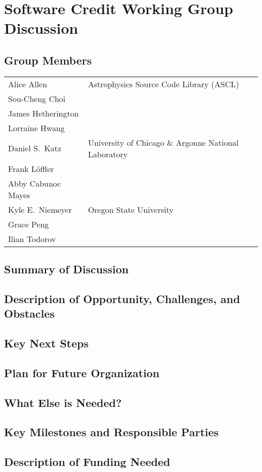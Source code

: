 \section{Software Credit Working Group Discussion}
\label{sec:appendix_SW_credit}

\subsection{Group Members}
{\small
\begin{longtable}{ll}
   Alice Allen            &  Astrophysics Source Code Library (ASCL)
\\ Sou-Cheng Choi         &  
\\ James Hetherington     &  
\\ Lorraine Hwang         &  
\\ Daniel S.\ Katz        &  University of Chicago \& Argonne National Laboratory
\\ Frank Löffler          &  
\\ Abby Cabunoc Mayes     & 
\\ Kyle E.\ Niemeyer      &  Oregon State University
\\ Grace Peng             &  
\\ Ilian Todorov          &  
\end{longtable}
}

\subsection{Summary of Discussion}

\subsection{Description of Opportunity, Challenges, and Obstacles}


\subsection{Key Next Steps}


\subsection{Plan for Future Organization}


\subsection{What Else is Needed?}


\subsection{Key Milestones and Responsible Parties}


\subsection{Description of Funding Needed}
